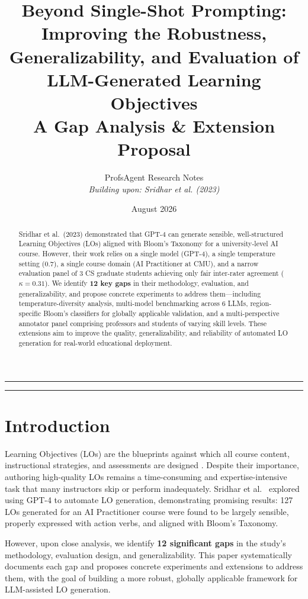 \documentclass[11pt,a4paper]{article}
\title{
\vspace{-1cm}
\textbf{Beyond Single-Shot Prompting:}\\[0.3cm]
\large Improving the Robustness, Generalizability, and Evaluation of LLM-Generated Learning Objectives\\[0.5cm]
\normalsize A Gap Analysis \& Extension Proposal
}
\author{
ProfsAgent Research Notes\\
\textit{Building upon: Sridhar et al. (2023) \cite{sridhar2023}}
}
\date{August 2026}
\begin{document}
\maketitle
\thispagestyle{fancy}

\begin{abstract}
Sridhar et al.\ (2023) demonstrated that GPT-4 can generate sensible, well-structured Learning Objectives (LOs) aligned with Bloom's Taxonomy for a university-level AI course. However, their work relies on a single model (GPT-4), a single temperature setting (0.7), a single course domain (AI Practitioner at CMU), and a narrow evaluation panel of 3 CS graduate students achieving only fair inter-rater agreement ($\kappa = 0.31$). We identify \textbf{12 key gaps} in their methodology, evaluation, and generalizability, and propose concrete experiments to address them---including temperature-diversity analysis, multi-model benchmarking across 6 LLMs, region-specific Bloom's classifiers for globally applicable validation, and a multi-perspective annotator panel comprising professors and students of varying skill levels. These extensions aim to improve the quality, generalizability, and reliability of automated LO generation for real-world educational deployment.
\end{abstract}

\noindent\rule{\textwidth}{0.4pt}
\tableofcontents
\noindent\rule{\textwidth}{0.4pt}
\vspace{0.3cm}

\section{Introduction}

Learning Objectives (LOs) are the blueprints against which all course content, instructional strategies, and assessments are designed \cite{bloom1956, krathwohl2002}. Despite their importance, authoring high-quality LOs remains a time-consuming and expertise-intensive task that many instructors skip or perform inadequately. Sridhar et al.\ \cite{sridhar2023} explored using GPT-4 to automate LO generation, demonstrating promising results: 127 LOs generated for an AI Practitioner course were found to be largely sensible, properly expressed with action verbs, and aligned with Bloom's Taxonomy.

However, upon close analysis, we identify \textbf{12 significant gaps} in the study's methodology, evaluation design, and generalizability. This paper systematically documents each gap and proposes concrete experiments and extensions to address them, with the goal of building a more robust, globally applicable framework for LLM-assisted LO generation.
\end{document}
